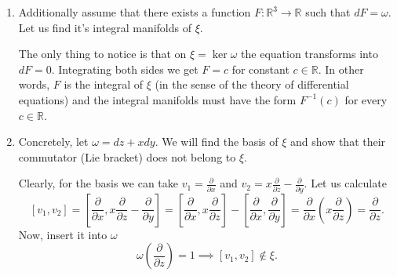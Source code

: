 \documentclass[a4paper, 12pt]{article} %
\newcommand{\R}{\mathbb{R}}
\begin{document}
\begin{enumerate}[label=(\alph*)]
	\item Additionally assume that there exists a function $F \colon \R^3 \to \R$ such that $dF = \omega$. Let us find it's integral manifolds of $\xi$.
	
	The only thing to notice is that on $\xi = \ker\omega$ the equation transforms into $dF = 0$. Integrating both sides we get $F = c$ for constant $c \in \R$. In other words, $F$ is the integral of $\xi$ (in the sense of the theory of differential equations) and the integral manifolds must have the form $F^{-1}(c)$ for every $c \in \R$.
	
	\item Concretely, let $\omega = dz + xdy$. We will find the basis of $\xi$ and show that their commutator (Lie bracket) does not belong to $\xi$.
	
	Clearly, for the basis we can take $v_1 = \frac{\partial}{\partial x}$ and $v_2 = x\frac{\partial}{\partial z} - \frac{\partial}{\partial y}$. Let us calculate
	\[
	[v_1, v_2] = [\frac{\partial}{\partial x}, x\frac{\partial}{\partial z} - \frac{\partial}{\partial y}] = [\frac{\partial}{\partial x}, x\frac{\partial}{\partial z}] - [\frac{\partial}{\partial x}, \frac{\partial}{\partial y}] = \frac{\partial}{\partial x}(x\frac{\partial}{\partial z}) = \frac{\partial}{\partial z}.
	\]
	Now, insert it into $\omega$
	\[
	\omega(\frac{\partial}{\partial z}) = 1 \implies [v_1, v_2] \notin \xi.
	\]
\end{enumerate}
\end{document}
